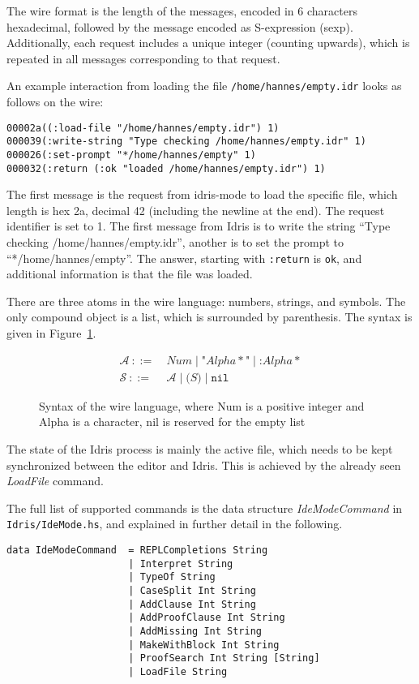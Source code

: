 \documentclass{article}
\begin{document}
The wire format is the length of the messages, encoded in 6 characters hexadecimal, followed by the message encoded as S-expression (sexp).
Additionally, each request includes a unique integer (counting upwards), which is repeated in all messages corresponding to that request.

An example interaction from loading the file \texttt{/home/hannes/empty.idr} looks as follows on the wire:
\begin{verbatim}
00002a((:load-file "/home/hannes/empty.idr") 1)
000039(:write-string "Type checking /home/hannes/empty.idr" 1)
000026(:set-prompt "*/home/hannes/empty" 1)
000032(:return (:ok "loaded /home/hannes/empty.idr") 1)
\end{verbatim}

The first message is the request from idris-mode to load the specific file, which length is hex 2a, decimal 42 (including the newline at the end).
The request identifier is set to 1.
The first message from Idris is to write the string ``Type checking /home/hannes/empty.idr'', another is to set the prompt to ``*/home/hannes/empty''.
The answer, starting with \texttt{:return} is \texttt{ok}, and additional information is that the file was loaded.

There are three atoms in the wire language: numbers, strings, and symbols.
The only compound object is a list, which is surrounded by parenthesis.
The syntax is given in Figure~\ref{fig:syntax}.

\begin{figure}
\centering
\begin{align*}
\mathcal{A}{~::=~}&\mathit{Num} \mid \texttt{"} \mathit{Alpha*} \texttt{"} \mid \texttt{:}\mathit{Alpha*}\\
\mathcal{S}{~::=~}&\mathcal{A} \mid \texttt{(} S \texttt{)} \mid \texttt{nil}
\end{align*}
\caption{Syntax of the wire language, where Num is a positive integer and Alpha is a character, nil is reserved for the empty list}
\label{fig:syntax}
\end{figure}

The state of the Idris process is mainly the active file, which needs to be kept synchronized between the editor and Idris.
This is achieved by the already seen \emph{LoadFile} command.

The full list of supported commands is the data structure \emph{IdeModeCommand} in \texttt{Idris/IdeMode.hs}, and explained in further detail in the following.

\begin{verbatim}
data IdeModeCommand  = REPLCompletions String
                     | Interpret String
                     | TypeOf String
                     | CaseSplit Int String
                     | AddClause Int String
                     | AddProofClause Int String
                     | AddMissing Int String
                     | MakeWithBlock Int String
                     | ProofSearch Int String [String]
                     | LoadFile String
\end{verbatim}
\end{document}

